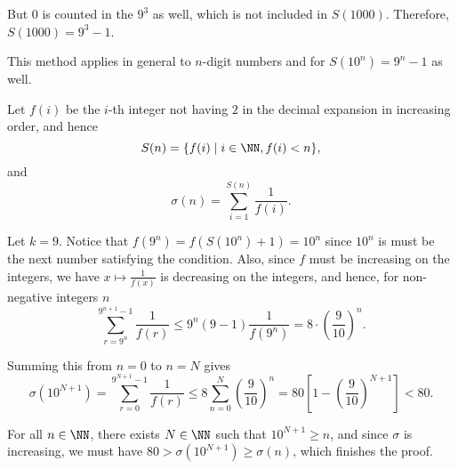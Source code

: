 \begin{enumerate}
          But \(0\) is counted in the \(9^3\) as well, which is not included in \(S(1000)\). Therefore, \(S(1000) = 9^3 - 1\).

          This method applies in general to \(n\)-digit numbers and for \(S(10^n) = 9^n - 1\) as well.

          Let \(f(i)\) be the \(i\)-th integer not having \(2\) in the decimal expansion in increasing order, and hence
          \[
              S(n) = \{f(i) \mid i \in \NN, f(i) < n\},
          \]
          and
          \[
              \sigma(n) = \sum_{i = 1}^{S(n)} \frac{1}{f(i)}.
          \]

          Let \(k = 9\). Notice that \(f(9^n) = f(S(10^n) + 1) = 10^n\) since \(10^n\) is must be the next number satisfying the condition. Also, since \(f\) must be increasing on the integers, we have \(x \mapsto \frac{1}{f(x)}\) is decreasing on the integers, and hence, for non-negative integers \(n\)
          \[
              \sum_{r = 9^n}^{9^{n + 1} - 1} \frac{1}{f(r)} \leq 9^n (9 - 1) \frac{1}{f(9^n)} = 8 \cdot \left(\frac{9}{10}\right)^n.
          \]

          Summing this from \(n = 0\) to \(n = N\) gives
          \[
              \sigma(10^{N + 1}) = \sum_{r = 0}^{9^{N + 1} - 1} \frac{1}{f(r)} \leq 8 \sum_{n = 0}^{N} \left(\frac{9}{10}\right)^n = 80 \left[1 - \left(\frac{9}{10}\right)^{N + 1} \right] < 80.
          \]

          For all \(n \in \NN\), there exists \(N \in \NN\) such that \(10^{N + 1} \geq n\), and since \(\sigma\) is increasing, we must have \(80 > \sigma(10^{N + 1}) \geq \sigma(n)\), which finishes the proof.

\end{enumerate}